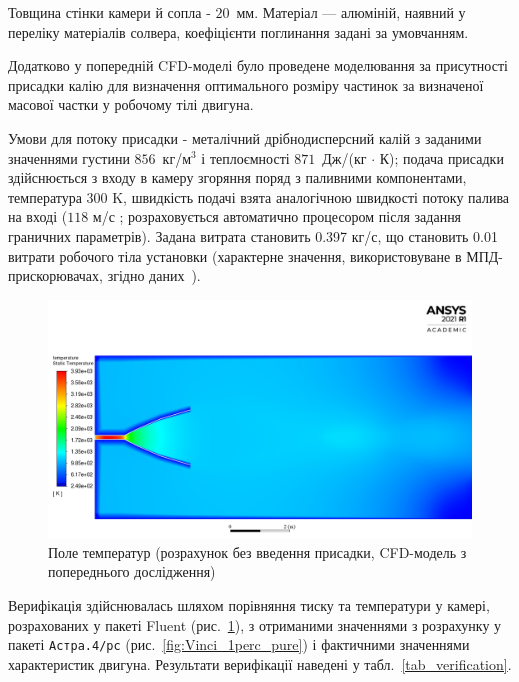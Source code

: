 Товщина стінки камери й сопла - $20$~мм. Матеріал --- алюміній, наявний у переліку матеріалів солвера, коефіцієнти поглинання задані за умовчанням.

Додатково у попередній CFD-моделі було проведене моделювання за присутності присадки калію для визначення оптимального розміру частинок за визначеної масової частки у робочому тілі двигуна.

Умови для потоку присадки - металічний дрібнодисперсний калій з заданими значеннями густини $ 856 $~кг/м$^3$ і теплоємності $871$~Дж/(кг $\cdot$ К); подача присадки здійснюється з входу в камеру згоряння поряд з паливними компонентами, температура 300 K, швидкість подачі взята аналогічною швидкості потоку палива на вході ($118$ м/с ; розраховується автоматично процесором після задання граничних параметрів). Задана витрата становить 0.397 кг/с, що становить 0.01 витрати робочого тіла установки (характерне значення, використовуване в МПД-прискорювачах, згідно даних~\cite{Panchenko}).

\begin{figure}
	\centering
	\includegraphics[width=0.7\textheight, angle=0,origin=c]{chapter_3/pure_temperature.jpg}
	\caption{Поле температур (розрахунок без введення присадки, CFD-модель з попереднього дослідження)~\cite{Previous}}
	\label{fig:pure_temperature}
\end{figure}

Верифікація здійснювалась шляхом порівняння тиску та температури у камері, розрахованих у пакеті Fluent (рис.~\ref{fig:pure_temperature}), з отриманими значеннями з розрахунку у пакеті \texttt{Астра.4/рс} (рис.~\ref{fig:Vinci_1perc_pure}) і фактичними значеннями характеристик двигуна. Результати верифікації наведені у табл.~\ref{tab_verification}.

